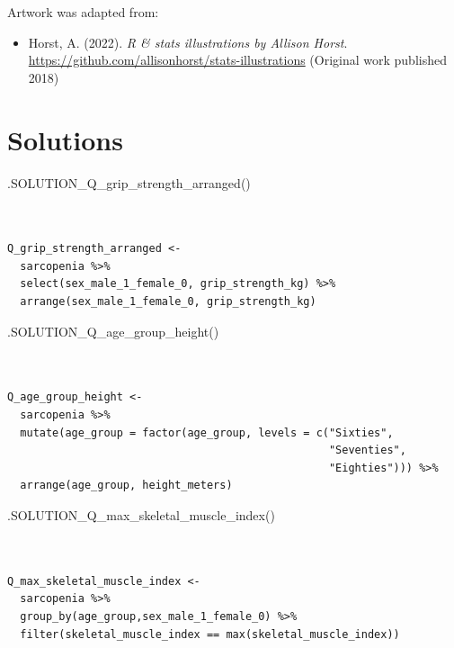 \documentclass[
  letterpaper,
  DIV=11,
  numbers=noendperiod]{scrreprt}
\newenvironment{Shaded}{\begin{snugshade}}{\end{snugshade}}
\newcommand{\FunctionTok}[1]{\textcolor[rgb]{0.28,0.35,0.67}{#1}}
\newcommand{\NormalTok}[1]{\textcolor[rgb]{0.00,0.23,0.31}{#1}}
\providecommand{\tightlist}{%
  \setlength{\itemsep}{0pt}\setlength{\parskip}{0pt}}\usepackage{longtable,booktabs,array}
\begin{document}
Artwork was adapted from:

\begin{itemize}
\tightlist
\item
  Horst, A. (2022). \emph{R \& stats illustrations by Allison Horst}.
  \url{https://github.com/allisonhorst/stats-illustrations} (Original
  work published 2018)
\end{itemize}

\hypertarget{solutions-6}{%
\section{Solutions}\label{solutions-6}}

\begin{Shaded}
\begin{Highlighting}[]
\FunctionTok{.SOLUTION\_Q\_grip\_strength\_arranged}\NormalTok{()}
\end{Highlighting}
\end{Shaded}

\begin{verbatim}


Q_grip_strength_arranged <- 
  sarcopenia %>%
  select(sex_male_1_female_0, grip_strength_kg) %>%
  arrange(sex_male_1_female_0, grip_strength_kg)
\end{verbatim}

\begin{Shaded}
\begin{Highlighting}[]
\FunctionTok{.SOLUTION\_Q\_age\_group\_height}\NormalTok{()}
\end{Highlighting}
\end{Shaded}

\begin{verbatim}


Q_age_group_height <- 
  sarcopenia %>%
  mutate(age_group = factor(age_group, levels = c("Sixties",
                                                  "Seventies",
                                                  "Eighties"))) %>%
  arrange(age_group, height_meters)
\end{verbatim}

\begin{Shaded}
\begin{Highlighting}[]
\FunctionTok{.SOLUTION\_Q\_max\_skeletal\_muscle\_index}\NormalTok{()}
\end{Highlighting}
\end{Shaded}

\begin{verbatim}


Q_max_skeletal_muscle_index <- 
  sarcopenia %>%
  group_by(age_group,sex_male_1_female_0) %>%
  filter(skeletal_muscle_index == max(skeletal_muscle_index))
\end{verbatim}
\end{document}
